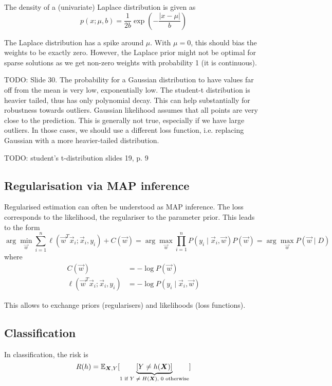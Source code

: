 The density of a (univariate) Laplace distribution is given as
\begin{equation*}
p(x; \mu, b) = \frac{1}{2b} \exp{\left(
	-\frac{|x - \mu|}{b}
	\right)}
\end{equation*}

The Laplace distribution has a spike around $\mu$.
With $\mu = 0$, this should bias the weights to be exactly zero.
However, the Laplace prior might not be optimal
for sparse solutions as we get non-zero weights
with probability 1 (it is continuous).

TODO: Slide 30.
The probability for a Gaussian distribution to have values far off from the mean is very low,
exponentially low.
The student-t distribution is heavier tailed, thus has only polynomial decay.
This can help substantially for robustness towards outliers.
Gaussian likelihood assumes that all points are very close to the prediction.
This is generally not true, especially if we have large outliers.
In those cases, we should use a different loss function,
i.e. replacing Gaussian with a more heavier-tailed distribution.

TODO: student's t-distribution slides 19, p. 9

\subsection{Regularisation via MAP inference}
Regularised estimation can often be understood as MAP inference.
The loss corresponds to the likelihood,
the regulariser to the parameter prior.
This leads to the form
\begin{equation*}
\arg\min_{\vec{w}}{
	\sum_{i=1}^n{\ell(\vec{w}^T \vec{x}_i; \vec{x}_i, y_i)}
	+ C(\vec{w})
}
= \arg\max_{\vec{w}}{
	\prod_{i=1}^n{P(y_i \mid \vec{x}_i, \vec{w})} P(\vec{w})
}
= \arg\max_{\vec{w}}{P(\vec{w} \mid D)}
\end{equation*}
where
\begin{align*}
C(\vec{w}) &= - \log{P(\vec{w})} \\
\ell(\vec{w}^T \vec{x}_i; \vec{x}_i, y_i)
&= -\log{P(y_i \mid \vec{x}_i, \vec{w})}
\end{align*}

This allows to exchange priors (regularisers)
and likelihoods (loss functions).


\subsection{Classification}
In classification, the risk is
\begin{equation*}
R(h) = \mathbb{E}_{\boldsymbol{X}, Y}[
\underbrace{[Y \neq h(\boldsymbol{X})]}_\text{$1$ if $Y \neq H(\boldsymbol{X})$, $0$ otherwise}
]
\end{equation*}

